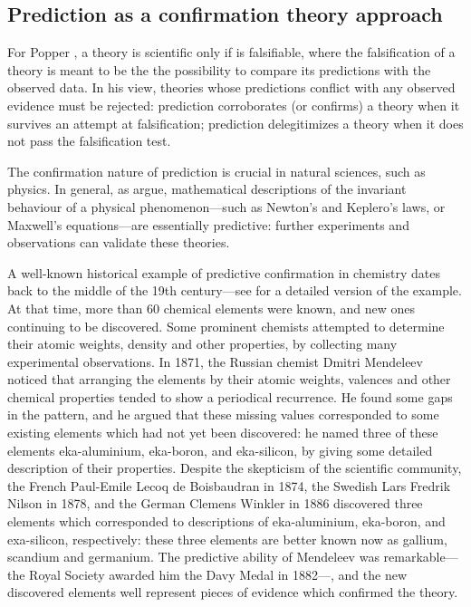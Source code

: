 \documentclass{statsoc}
\begin{document}

\subsection{Prediction as a confirmation theory approach}


For Popper \citep{popper1934logic}, a theory is scientific only if is falsifiable, where the falsification of a theory is meant to be the the possibility to compare its predictions 
with the observed data. In his view, theories whose predictions conflict with any observed evidence must be rejected: prediction corroborates (or confirms) a theory when it survives 
an attempt at falsification; prediction delegitimizes a theory when it does not pass the falsification test.

The confirmation nature of prediction is crucial in natural sciences, such as physics. In general,  as \cite{hitchcock2004prediction} argue,   mathematical descriptions of the 
invariant behaviour of a physical phenomenon---such as Newton's and Keplero's laws, or Maxwell's equations---are essentially predictive: further experiments and observations can validate these theories. 

A well-known historical example of predictive confirmation in chemistry dates back to the middle of the 19th century---see \cite{maher1988prediction} for a detailed version of the 
example. At that time, more than 60 chemical elements were known, and new ones continuing to be discovered. Some prominent chemists attempted to determine their atomic weights, 
density and other properties, by collecting many experimental observations. In 1871, the Russian chemist Dmitri Mendeleev noticed that arranging the elements by their atomic 
weights, valences and other chemical properties tended to show a periodical recurrence. He found some gaps in the pattern, and he argued that these missing values corresponded to 
some existing elements which had not yet been discovered: he named three of these elements eka-aluminium, eka-boron, and eka-silicon, by giving some detailed description of their 
properties. Despite the skepticism of the scientific community, the French Paul-Emile Lecoq de Boisbaudran in 1874, the Swedish Lars Fredrik Nilson in 1878, and the German Clemens 
Winkler in 1886 discovered three elements which corresponded to descriptions of eka-aluminium, eka-boron, and exa-silicon, respectively: these three elements are better known 
now as gallium, scandium and germanium. The predictive ability of Mendeleev was remarkable---the Royal Society awarded him the Davy Medal in 1882---, and the new discovered elements well represent pieces of evidence which confirmed the theory.
\end{document}

